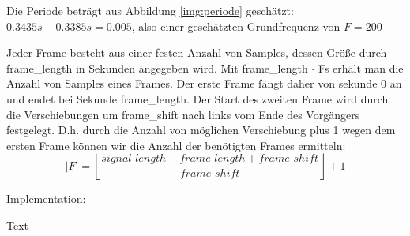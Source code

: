 Die Periode beträgt aus Abbildung \ref{img:periode} geschätzt: 
$ 0.3435 s -0.3385 s = 0.005$, also einer geschätzten Grundfrequenz von $ F = 200$





Jeder Frame besteht aus einer festen Anzahl von Samples, dessen Größe durch
frame\_length in Sekunden angegeben wird.  Mit frame\_length $\cdot$ Fs erhält
man die Anzahl von Samples eines Frames. Der erste Frame fängt daher von
sekunde 0 an und endet bei Sekunde frame\_length.  Der Start des zweiten Frame wird durch
die Verschiebungen um frame\_shift nach links vom Ende des Vorgängers festgelegt.
D.h. durch die Anzahl von möglichen Verschiebung plus 1 wegen dem ersten Frame
können wir die Anzahl der benötigten Frames ermitteln:
\[
	|F| = \left \lfloor
	\frac{signal\_length - frame\_length + frame\_shift}
	{frame\_shift} \right \rfloor + 1
\]

Implementation: 




Text


